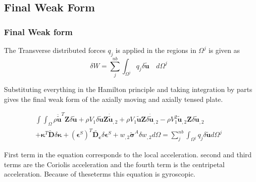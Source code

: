 \documentclass[9pt]{beamer}
\newcommand{\vect}[1]{\boldsymbol{#1}}
\begin{document}
\subsection{Final Weak Form}
\begin{frame}\frametitle{Final Weak form}



The Transverse distributed forces $q_j$ is applied in the regions in $\Omega^j$ is given as
\begin{equation*}\label{eq:vr_W}
\delta W=\sum_j^{nb} \int_{\Omega^j} q_j \delta \vect{\tilde{u}} \quad  d \Omega^j
\end{equation*}


Substituting everything in the Hamilton principle and taking integration by parts gives the final weak form of the axially moving and axially tensed plate.



\begin{equation*}
\begin{split}
\int \int_\Omega 
\rho \vect{\ddot{\tilde{u}}}^T \vect{Z} \delta \vect {{\tilde{u}}}
+  
\rho V_1 \delta \vect{\tilde{u}} \vect{Z} \vect{\dot{\tilde{u}}}_{,2} 
+ 
\rho V_1  \vect{\tilde{u}} \vect{Z} \delta \vect{\dot{\tilde{u}}}_{,2} 
-
\rho V_1^2 \vect{\tilde{u}}_{,2} \vect{Z} \delta \vect{\tilde{u}}_{,2}
\\ 
+ 
\vect{\kappa}^T \vect{\tilde{D}} \delta \vect{\kappa} 
+
\left(\vect{\epsilon}^S\right)^T \vect{\tilde{D_c}} \delta\vect{\epsilon}^S 
+
 w_{, 2} \vect{\tilde{\sigma}}^A  \delta w_{, 2}  d \Omega     
 =  
\sum_j^{nb} \int_{\Omega^j} q_j \delta \vect{\tilde{u}}  d \Omega^j 
\end{split} 
\end{equation*}

First term in the equation corresponds to the local acceleration. second and third terms are the Coriolis acceleration and the fourth term is the centripetal acceleration. Because of theseterms this equation is gyroscopic. 

\end{frame}
\end{document}
